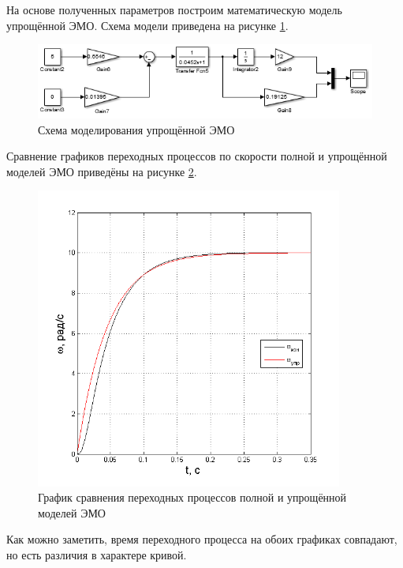 \documentclass[fleqn, a4paper, 11pt, russian]{article}
\begin{document}
	На основе полученных параметров построим математическую модель упрощённой ЭМО. Схема модели приведена на рисунке \ref{simpModel}.
	\begin{figure}[ht!]
		\centering
		\includegraphics[width = \textwidth]{simpModel}
		\caption{Схема моделирования упрощённой ЭМО}
		\label{simpModel}
	\end{figure}
	\newpage
	Сравнение графиков переходных процессов по скорости полной и упрощённой моделей ЭМО приведёны на рисунке \ref{simpTP}.
	\begin{figure}[ht!]
		\centering
		\includegraphics[width = 0.9\textwidth]{simpTP}
		\caption{График сравнения переходных процессов полной и упрощённой моделей ЭМО}
		\label{simpTP}
	\end{figure}
	
	Как можно заметить, время переходного процесса на обоих графиках совпадают, но есть различия в характере кривой.
	
\end{document}

